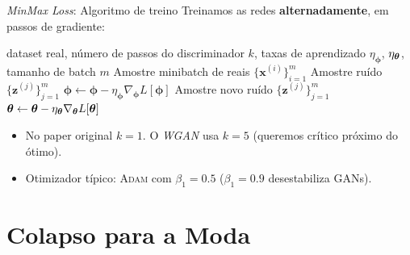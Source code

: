 \documentclass[aspectratio=169,xcolor=dvipsnames]{beamer}
\begin{document}
  \begin{frame}{\textit{MinMax Loss}: Algoritmo de treino}
    \small
    Treinamos as redes \textbf{alternadamente}, em passos de gradiente:
    \vspace{0.3em}
    \begin{algorithmic}[1]
      \Require dataset real, número de passos do discriminador $k$,
               taxas de aprendizado $\eta_{\bm{\phi}}$, $\eta_{\bm{\theta}}$,
               tamanho de batch $m$
          \State Amostre minibatch de reais $\{\mathbf{x}^{(i)}\}_{i=1}^{m}$
          \State Amostre ruído $\{\mathbf{z}^{(j)}\}_{j=1}^{m}$
          \State $\bm{\phi} \leftarrow \bm{\phi} - \eta_{\bm{\phi}} \nabla_{\bm{\phi}} L[\bm{\phi}]$
        \EndFor
        \State Amostre novo ruído $\{\mathbf{z}^{(j)}\}_{j=1}^{m}$
        \State $\bm{\theta} \leftarrow \bm{\theta} - \eta_{\bm{\theta}} \nabla_{\bm{\theta}} L[\bm{\theta}]$
      \EndWhile
    \end{algorithmic}
    \vspace{0.3em}
    \begin{itemize}
      \item No paper original $k=1$. O \textit{WGAN} usa $k=5$
      (queremos crítico próximo do ótimo).
      \item Otimizador típico: \textsc{Adam} com $\beta_1 = 0.5$
      ($\beta_1 = 0.9$ desestabiliza GANs).
    \end{itemize}
  \end{frame}

  \section{Colapso para a Moda}
\end{document}
